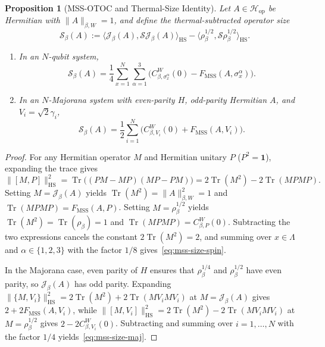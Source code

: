 \documentclass[11pt,a4paper]{article}
\numberwithin{equation}{section}
\theoremstyle{plain}
\newtheorem{proposition}[theorem]{Proposition}
\theoremstyle{definition}
\newcommand{\Hop}{\mathcal{H}_{\mathrm{op}}}
\newcommand{\HS}{\mathrm{HS}}
\newcommand{\MSS}{\mathrm{MSS}}
\newcommand{\Tr}{\operatorname{Tr}}
\begin{document}
\begin{proposition}[MSS-OTOC and Thermal-Size Identity]\label{prop:mss-size}
Let $A\in\Hop$ be Hermitian with $\|A\|_{\beta,W}=1$, and define the thermal-subtracted operator size
\[
  \mathcal{S}_\beta(A) := \langle\mathcal{J}_\beta(A),\mathcal{S}\mathcal{J}_\beta(A)\rangle_\HS - \langle\rho_\beta^{1/2},\mathcal{S}\rho_\beta^{1/2}\rangle_\HS.
\]
\begin{enumerate}
  \setlength{\itemsep}{2pt}\setlength{\parskip}{0pt}
  \item[\emph{(1)}] In an $N$-qubit system,
  \begin{equation}\label{eq:mss-size-spin}
    \mathcal{S}_\beta(A) = \frac{1}{4}\sum_{x=1}^N\sum_{\alpha=1}^3 \bigl(C_{\beta,\sigma_x^\alpha}^W(0) - F_\MSS(A,\sigma_x^\alpha)\bigr).
  \end{equation}
  \item[\emph{(2)}] In an $N$-Majorana system with even-parity $H$, odd-parity Hermitian $A$, and $V_i=\sqrt{2}\gamma_i$,
  \begin{equation}\label{eq:mss-size-maj}
    \mathcal{S}_\beta(A) = \frac{1}{2}\sum_{i=1}^N \bigl(C_{\beta,V_i}^W(0) + F_\MSS(A,V_i)\bigr).
  \end{equation}
\end{enumerate}
\end{proposition}

\begin{proof}
For any Hermitian operator $M$ and Hermitian unitary $P$ ($P^2=\mathbf{1}$), expanding the trace gives
\[
  \|[M,P]\|_\HS^2 = \Tr\bigl((PM-MP)(MP-PM)\bigr) = 2\Tr(M^2) - 2\Tr(MPMP).
\]
Setting $M = \mathcal{J}_\beta(A)$ yields $\Tr(M^2) = \|A\|_{\beta,W}^2 = 1$ and $\Tr(MPMP) = F_\MSS(A,P)$. Setting $M = \rho_\beta^{1/2}$ yields $\Tr(M^2) = \Tr(\rho_\beta) = 1$ and $\Tr(MPMP) = C_{\beta,P}^W(0)$. Subtracting the two expressions cancels the constant $2\Tr(M^2)=2$, and summing over $x\in\Lambda$ and $\alpha\in\{1,2,3\}$ with the factor $1/8$ gives~\eqref{eq:mss-size-spin}.

In the Majorana case, even parity of $H$ ensures that $\rho_\beta^{1/4}$ and $\rho_\beta^{1/2}$ have even parity, so $\mathcal{J}_\beta(A)$ has odd parity. Expanding $\|\{M,V_i\}\|_\HS^2 = 2\Tr(M^2)+2\Tr(MV_iMV_i)$ at $M=\mathcal{J}_\beta(A)$ gives $2+2F_\MSS(A,V_i)$, while $\|[M,V_i]\|_\HS^2 = 2\Tr(M^2)-2\Tr(MV_iMV_i)$ at $M=\rho_\beta^{1/2}$ gives $2-2C_{\beta,V_i}^W(0)$. Subtracting and summing over $i=1,\dots,N$ with the factor $1/4$ yields~\eqref{eq:mss-size-maj}.
\end{proof}
\end{document}
